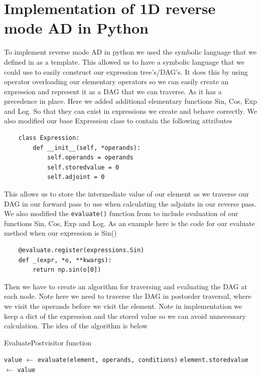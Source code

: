 \documentclass{article}
\begin{document}
\section{Implementation of 1D reverse mode AD in Python}

To implement reverse mode AD in python we used the symbolic language that we defined in \cite{PoPBook} as a template. This allowed us to have a symbolic language that we could use to easily construct our expression tree's/DAG's. It does this by using operator overloading our elementary operators so we can easily create an expression and represent it as a DAG that we can traverse. As it has a precedence in place. Here we added additional elementary functions Sin, Cos, Exp and Log. So that they can exist in expressions we create and behave correctly. We also modified our base Expression class to contain the following attributes
\begin{verbatim}
    class Expression:
        def __init__(self, *operands):
            self.operands = operands
            self.storedvalue = 0
            self.adjoint = 0
\end{verbatim}
This allows us to store the intermediate value of our element as we traverse our DAG in our forward pass to use when calculating the adjoints in our reverse pass.
We also modified the \verb|evaluate()| function from \cite{PoPBook} to include evaluation of our functions Sin, Cos, Exp and Log. As an example here is the code for our evaluate method when our expression is Sin()
\begin{verbatim}
    @evaluate.register(expressions.Sin)
    def _(expr, *o, **kwargs):
        return np.sin(o[0])
\end{verbatim}
Then we have to create an algorithm for traversing and evaluating the DAG at each node. Note here we need to traverse the DAG in postorder traversal, where we visit the operands before we visit the element. Note in implementation we keep a dict of the expression and the stored value so we can avoid unnecessary calculation. The idea of the algorithm is below

\begin{algorithm}[h]
\caption{EvaluatePostvisitor function}\label{EvaluatePostvisitor}
\begin{algorithmic}[1]
\State \verb|value| $\gets$ \verb|evaluate(element, operands, conditions)|
\State \verb|element.storedvalue| $\gets$ \verb|value|
\EndFor
\EndProcedure
\end{algorithmic}
\end{algorithm}
\end{document}
